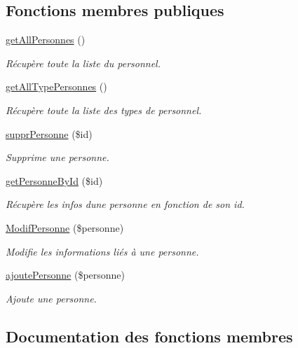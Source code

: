 \subsection*{Fonctions membres publiques}
\begin{DoxyCompactItemize}
\item 
\hyperlink{class_m___personnel_ab03a572f8f3d3d70971e5c1c57612904}{get\+All\+Personnes} ()
\begin{DoxyCompactList}\small\item\em Récupère toute la liste du personnel. \end{DoxyCompactList}\item 
\hyperlink{class_m___personnel_a67826be42806c168be64c8ca00676999}{get\+All\+Type\+Personnes} ()
\begin{DoxyCompactList}\small\item\em Récupère toute la liste des types de personnel. \end{DoxyCompactList}\item 
\hyperlink{class_m___personnel_a94c2d91e30254a22ab6ce48505f96840}{suppr\+Personne} (\$id)
\begin{DoxyCompactList}\small\item\em Supprime une personne. \end{DoxyCompactList}\item 
\hyperlink{class_m___personnel_ae43e64dd0b895782af4d3c3778fe07e0}{get\+Personne\+By\+Id} (\$id)
\begin{DoxyCompactList}\small\item\em Récupère les infos d\textquotesingle{}une personne en fonction de son id. \end{DoxyCompactList}\item 
\hyperlink{class_m___personnel_a40c4d5e76e509cfafdd586cfeb4bb37c}{Modif\+Personne} (\$personne)
\begin{DoxyCompactList}\small\item\em Modifie les informations liés à une personne. \end{DoxyCompactList}\item 
\hyperlink{class_m___personnel_a69aa8535f8aa3cbe50066b10bdad2d7b}{ajoute\+Personne} (\$personne)
\begin{DoxyCompactList}\small\item\em Ajoute une personne. \end{DoxyCompactList}\end{DoxyCompactItemize}


\subsection{Documentation des fonctions membres}
\mbox{\label{class_m___personnel_a69aa8535f8aa3cbe50066b10bdad2d7b}} 
